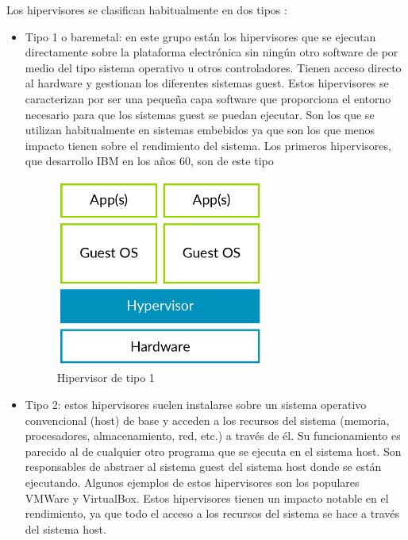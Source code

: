 Los hipervisores se clasifican habitualmente en dos tipos \cite{Popek1974}\cite{hyper_review}:
\begin{itemize}
\item Tipo 1 o baremetal: en este grupo están los hipervisores que se ejecutan directamente sobre
la plataforma electrónica sin ningún otro software de por medio del tipo sistema operativo u
otros controladores. Tienen acceso directo al hardware y gestionan los diferentes sistemas guest. Estos hipervisores se caracterizan por ser una pequeña capa software que proporciona el entorno necesario para que los sistemas guest se puedan ejecutar. Son los que se utilizan habitualmente en sistemas embebidos ya que son los que menos impacto tienen sobre el rendimiento del sistema. Los primeros hipervisores, que desarrollo IBM en los años 60, son de este tipo \cite{hyper_review}\\
\begin{figure}[!htb]
	\centering
	\includegraphics[width=0.65\textwidth]{recursos/type1_hyp.png}
	\caption{Hipervisor de tipo 1}
	\label{fig:hyper_type1}
\end{figure}
\item Tipo 2: estos hipervisores suelen instalarse sobre un sistema operativo convencional (host) de base y
acceden a los recursos del sistema (memoria, procesadores, almacenamiento, red, etc.) a
través de él. Su funcionamiento es parecido al de cualquier otro programa que se ejecuta en el sistema host. Son responsables de abstraer al sistema guest del sistema host donde se están ejecutando. Algunos ejemplos de estos hipervisores son los populares VMWare y VirtualBox. Estos hipervisores tienen un impacto notable en el rendimiento, ya que todo el acceso a los recursos del sistema se hace a través del sistema host.
\begin{figure}[!htb]

\end{figure}
\end{itemize}
